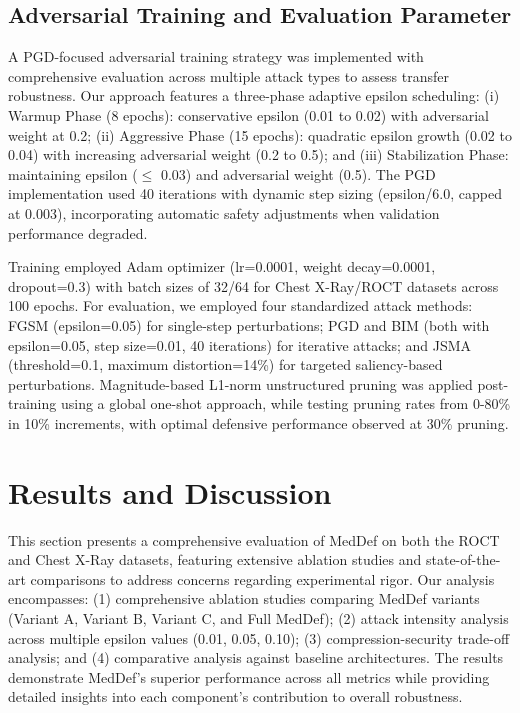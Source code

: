 \documentclass[preprint,12pt]{elsarticle}
\begin{document}
\subsection{Adversarial Training and Evaluation Parameter}
A PGD-focused adversarial training strategy was implemented with comprehensive evaluation across multiple attack types to assess transfer robustness. Our approach features a three-phase adaptive epsilon scheduling: (i) Warmup Phase (8 epochs): conservative epsilon (0.01 to 0.02) with adversarial weight at 0.2; (ii) Aggressive Phase (15 epochs): quadratic epsilon growth (0.02 to 0.04) with increasing adversarial weight (0.2 to 0.5); and (iii) Stabilization Phase: maintaining epsilon ($\leq$ 0.03) and adversarial weight (0.5). The PGD implementation used 40 iterations with dynamic step sizing (epsilon/6.0, capped at 0.003), incorporating automatic safety adjustments when validation performance degraded.

Training employed Adam optimizer (lr=0.0001, weight decay=0.0001, dropout=0.3) with batch sizes of 32/64 for Chest X-Ray/ROCT datasets across 100 epochs. For evaluation, we employed four standardized attack methods: FGSM (epsilon=0.05) for single-step perturbations; PGD and BIM (both with epsilon=0.05, step size=0.01, 40 iterations) for iterative attacks; and JSMA (threshold=0.1, maximum distortion=14\%) for targeted saliency-based perturbations. Magnitude-based L1-norm unstructured pruning was applied post-training using a global one-shot approach, while testing pruning rates from 0-80\% in 10\% increments, with optimal defensive performance observed at 30\% pruning.

\section{Results and Discussion}
\label{sec:results}

This section presents a comprehensive evaluation of MedDef on both the ROCT and Chest X-Ray datasets, featuring extensive ablation studies and state-of-the-art comparisons to address concerns regarding experimental rigor. Our analysis encompasses: (1) comprehensive ablation studies comparing MedDef variants (Variant A, Variant B, Variant C, and Full MedDef); (2) attack intensity analysis across multiple epsilon values (0.01, 0.05, 0.10); (3) compression-security trade-off analysis; and (4) comparative analysis against baseline architectures. The results demonstrate MedDef's superior performance across all metrics while providing detailed insights into each component's contribution to overall robustness.
\end{document}
